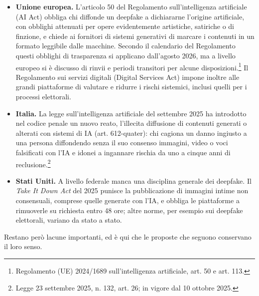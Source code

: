 \begin{itemize}
	\item \textbf{Unione europea.} L'articolo 50 del Regolamento sull'intelligenza artificiale (AI Act) obbliga chi diffonde un deepfake a dichiararne l'origine artificiale, con obblighi attenuati per opere evidentemente artistiche, satiriche o di finzione, e chiede ai fornitori di sistemi generativi di marcare i contenuti in un formato leggibile dalle macchine. Secondo il calendario del Regolamento questi obblighi di trasparenza si applicano dall'agosto 2026, ma a livello europeo si è discusso di rinvii e periodi transitori per alcune disposizioni.\footnote{Regolamento (UE) 2024/1689 sull'intelligenza artificiale, art. 50 e art. 113.} Il Regolamento sui servizi digitali (Digital Services Act) impone inoltre alle grandi piattaforme di valutare e ridurre i rischi sistemici, inclusi quelli per i processi elettorali.
	\item \textbf{Italia.} La legge sull'intelligenza artificiale del settembre 2025 ha introdotto nel codice penale un nuovo reato, l'illecita diffusione di contenuti generati o alterati con sistemi di IA (art. 612-quater): chi cagiona un danno ingiusto a una persona diffondendo senza il suo consenso immagini, video o voci falsificati con l'IA e idonei a ingannare rischia da uno a cinque anni di reclusione.\footnote{Legge 23 settembre 2025, n. 132, art. 26; in vigore dal 10 ottobre 2025.}
	\item \textbf{Stati Uniti.} A livello federale manca una disciplina generale dei deepfake. Il \textit{Take It Down Act} del 2025 punisce la pubblicazione di immagini intime non consensuali, comprese quelle generate con l'IA, e obbliga le piattaforme a rimuoverle su richiesta entro 48 ore; altre norme, per esempio sui deepfake elettorali, variano da stato a stato.
\end{itemize}

Restano però lacune importanti, ed è qui che le proposte che seguono conservano il loro senso.

